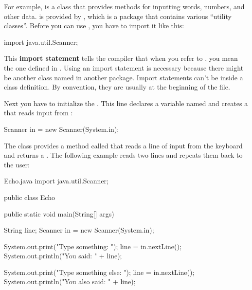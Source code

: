 
For example,  is a class that provides methods for inputting words, numbers, and other data.
 is provided by , which is a package that contains various ``utility classes''.
Before you can use , you have to import it like this:

\begin{code}
import java.util.Scanner;
\end{code}


This {\bf import statement} tells the compiler that when you refer to , you mean the one defined in .
Using an import statement is necessary because there might be another class named  in another package.
Import statements can't be inside a class definition.
By convention, they are usually at the beginning of the file.

Next you have to initialize the .
This line declares a  variable named  and creates a  that reads input from :

\begin{code}
Scanner in = new Scanner(System.in);
\end{code}

The  class provides a method called  that reads a line of input from the keyboard and returns a .
The following example reads two lines and repeats them back to the user:


\begin{trinket}{Echo.java}
import java.util.Scanner;

public class Echo {

    public static void main(String[] args) {
        String line;
        Scanner in = new Scanner(System.in);

        System.out.print("Type something: ");
        line = in.nextLine();
        System.out.println("You said: " + line);

        System.out.print("Type something else: ");
        line = in.nextLine();
        System.out.println("You also said: " + line);
    }
}
\end{trinket}

